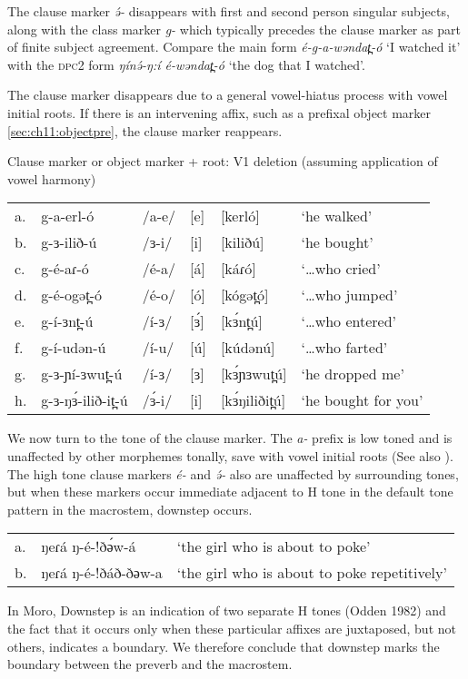 The clause marker \textit{ə́-} disappears with first and second person singular subjects, along with the class marker \textit{g-} which typically precedes the clause marker as part of finite subject agreement. Compare the main form \textit{é-g-a-wəndat̪-ó } ‘I watched it’ with the \textsc{dpc2} form \textit{ŋínə́-ŋ:í é-wəndat̪-ó } ‘the dog that I watched’.


The clause marker disappears due to a general vowel-hiatus process with vowel initial roots. If there is an intervening affix, such as a prefixal object marker \ref{sec:ch11:objectpre}, the clause marker reappears.

\ea Clause marker or object marker + root: V1 deletion (assuming application of vowel harmony) \label{ex:ch11:clausevhiatus}
\begin{tabular}[t]{llllll}
a.&	g-a-erl-ó	&	/a-e/	&	[e]	&	[kerló]	&	‘he walked’\\
b.&	g-ɜ-ilið-ú	&	/ɜ-i/	&	[i]	&	[kiliðú]	&	‘he bought’\\
c.&	g-é-aɾ-ó	&	/é-a/	&	[á]	&	[káɾó]	&	‘…who cried’	 \\
d.&	g-é-ogət̪-ó	&	/é-o/	&	[ó]	&	[kógət̪ó]&	‘…who jumped’\\
e.&	g-í-ɜnt̪-ú	&	/í-ɜ/	&	[ɜ́]	&	[kɜ́nt̪ú]	&	‘…who entered’\\
f.&	g-í-udən-ú	&	/í-u/	&	[ú]	&	[kúdənú]	&	‘…who farted’\\
g.&	g-ɜ-ɲí-ɜwut̪-ú&	/í-ɜ/	&	[ɜ]	&	[kɜ́ɲɜwut̪ú]&	‘he dropped me’\\
h.&	g-ɜ-ŋɜ́-ilið-it̪-ú&/ɜ́-i/	&	[i]	&	[kɜ́ŋiliðit̪ú]&	‘he bought for you’\\
\end{tabular}
\z 

We now turn to the tone of the clause marker. The \textit{a-} prefix is low toned and is unaffected by other morphemes tonally, save with vowel initial roots (See also ). The high tone clause markers \textit{é-} and \textit{ ə́- } also are unaffected by surrounding tones, but when these markers occur immediate adjacent to H tone in the default tone pattern in the macrostem, downstep occurs.

\ea  \begin{tabular}[t]{lll}
  	a. & 	 ŋeɾá ŋ-é-!ðә́w-á 	 &  `the girl who is about to poke'\\
	b. & 	ŋeɾá ŋ-é-!ðáð-ðәw-a  & 	`the girl who is about to poke repetitively' \\ 
  \end{tabular}
\z 
In Moro, Downstep is an indication of two separate H tones (Odden 1982) and the fact that it occurs only when these particular affixes are juxtaposed, but not others, indicates a boundary. We therefore conclude that downstep marks the boundary between the preverb and the macrostem.
	
